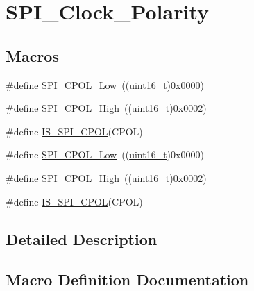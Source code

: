 \hypertarget{group___s_p_i___clock___polarity}{}\section{S\+P\+I\+\_\+\+Clock\+\_\+\+Polarity}
\label{group___s_p_i___clock___polarity}
\subsection*{Macros}
\begin{DoxyCompactItemize}
\item 
\#define \hyperlink{group___s_p_i___clock___polarity_ga3dbc0234c4b4e7c37137e7c189f3c085}{S\+P\+I\+\_\+\+C\+P\+O\+L\+\_\+\+Low}~((\hyperlink{_p_e___types_8h_a1f1825b69244eb3ad2c7165ddc99c956}{uint16\+\_\+t})0x0000)
\item 
\#define \hyperlink{group___s_p_i___clock___polarity_ga4431f2edf42f8298d5bbe693351edbb0}{S\+P\+I\+\_\+\+C\+P\+O\+L\+\_\+\+High}~((\hyperlink{_p_e___types_8h_a1f1825b69244eb3ad2c7165ddc99c956}{uint16\+\_\+t})0x0002)
\item 
\#define \hyperlink{group___s_p_i___clock___polarity_gafc1cc5b1ff7e801a409a7a1e6047acf9}{I\+S\+\_\+\+S\+P\+I\+\_\+\+C\+P\+OL}(C\+P\+OL)
\item 
\#define \hyperlink{group___s_p_i___clock___polarity_ga3dbc0234c4b4e7c37137e7c189f3c085}{S\+P\+I\+\_\+\+C\+P\+O\+L\+\_\+\+Low}~((\hyperlink{_p_e___types_8h_a1f1825b69244eb3ad2c7165ddc99c956}{uint16\+\_\+t})0x0000)
\item 
\#define \hyperlink{group___s_p_i___clock___polarity_ga4431f2edf42f8298d5bbe693351edbb0}{S\+P\+I\+\_\+\+C\+P\+O\+L\+\_\+\+High}~((\hyperlink{_p_e___types_8h_a1f1825b69244eb3ad2c7165ddc99c956}{uint16\+\_\+t})0x0002)
\item 
\#define \hyperlink{group___s_p_i___clock___polarity_gafc1cc5b1ff7e801a409a7a1e6047acf9}{I\+S\+\_\+\+S\+P\+I\+\_\+\+C\+P\+OL}(C\+P\+OL)
\end{DoxyCompactItemize}


\subsection{Detailed Description}


\subsection{Macro Definition Documentation}

